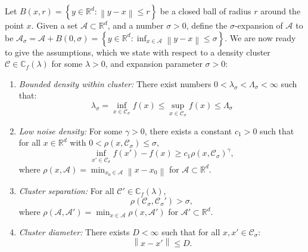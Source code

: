 \documentclass{article}
\newcommand{\diam}{\mathrm{diam}}
\newcommand{\set}[1]{\left\{#1\right\}}
\newcommand{\Reals}{\mathbb{R}}
\newcommand{\Rd}{\Reals^d}
\newcommand{\norm}[1]{\left\lVert#1\right\rVert}
\newcommand{\1}{\mathbf{1}}
\newcommand{\Cbb}{\mathbb{C}}
\newcommand{\Cset}{\mathcal{C}}
\newcommand{\Aset}{\mathcal{A}}
\newcommand{\Asig}{\Aset_{\sigma}}
\newcommand{\Csig}{\Cset_{\sigma}}
\theoremstyle{aldenthm}
\theoremstyle{remark}
\begin{document}
Let $B(x,r) = \set{y \in \Rd: \norm{y - x} \leq r}$ be a closed ball of radius $r$ around the point $x$.  Given a set $\Aset \subset \Rd$, and a number $\sigma > 0$, define the $\sigma$-expansion of $\Aset$ to be $\Asig = \Aset + B(0,\sigma) = \set{y \in \Rd: \inf_{x \in \Aset} \norm{y - x} \leq \sigma}$. We are now ready to give the assumptions, which we state with respect to a density cluster $\Cset \in \Cbb_f(\lambda)$ for some $\lambda > 0$, and expansion parameter $\sigma > 0$:
\begin{enumerate}[label=(A\arabic*)]
	\item
	\label{asmp: bounded_density}
	\textit{Bounded density within cluster:} There exist numbers $0 < \lambda_{\sigma} <  \Lambda_{\sigma} < \infty$ such that:
	\begin{equation}
	\label{eqn: bounded_density}
	\lambda_{\sigma} = \inf_{x \in \Csig} f(x) \leq \sup_{x \in \Csig} f(x) \leq \Lambda_{\sigma} 
	\end{equation} 
	
	\item 
	\label{asmp: low_noise_density}
	\textit{Low noise density:} For some $\gamma > 0 $, there exists a constant $c_1 > 0$ such that for all $x \in \Rd$ with $0 < \rho(x, \Csig) \leq \sigma$,
	\begin{equation*}
	\inf_{x' \in \Csig} f(x') - f(x) \geq c_1 \rho(x, \Csig)^{\gamma},
	\end{equation*}
	where $\rho(x,\Aset) = \min_{x_0 \in \Aset} \norm{x - x_0}$ for $\Aset \subset \Rd$.
	
	\item
	\label{asmp: cluster_separation}
	\textit{Cluster separation:}
	For all $\Cset' \in \Cbb_f(\lambda)$,
	\begin{equation*}
	\rho(\Csig,\Csig') > \sigma,
	\end{equation*}
	where $\rho(\Aset,\Aset') = \min_{x \in \Aset} \rho(x,\Aset')$ for $\Aset' \subset \Rd$. 
	
	\item
	\label{asmp: cluster_diameter}
	\textit{Cluster diameter:}
	There exists $D < \infty$ such that for all $x, x' \in \Csig$:
	\begin{equation*}
	\norm{x - x'} \leq D.
	\end{equation*}
\end{enumerate}
\end{document}
